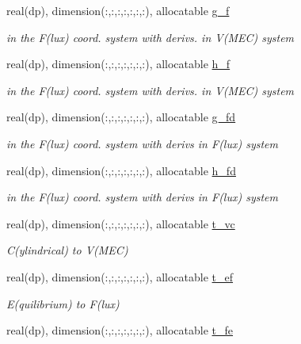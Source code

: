 \begin{DoxyCompactItemize}
real(dp), dimension(\+:,\+:,\+:,\+:,\+:,\+:,\+:), allocatable \hyperlink{structeq__vars_1_1eq__2__type_a86af2ae617633d732fbb3927f10b62d4}{g\+\_\+f}
\begin{DoxyCompactList}\small\item\em in the F(lux) coord. system with derivs. in V(\+M\+E\+C) system \end{DoxyCompactList}\item 
real(dp), dimension(\+:,\+:,\+:,\+:,\+:,\+:,\+:), allocatable \hyperlink{structeq__vars_1_1eq__2__type_a46e78cc3ec0be1ea9db664d9bdf5a214}{h\+\_\+f}
\begin{DoxyCompactList}\small\item\em in the F(lux) coord. system with derivs. in V(\+M\+E\+C) system \end{DoxyCompactList}\item 
real(dp), dimension(\+:,\+:,\+:,\+:,\+:,\+:,\+:), allocatable \hyperlink{structeq__vars_1_1eq__2__type_adaa37b20905a132d62a632ca5a60abf8}{g\+\_\+fd}
\begin{DoxyCompactList}\small\item\em in the F(lux) coord. system with derivs in F(lux) system \end{DoxyCompactList}\item 
real(dp), dimension(\+:,\+:,\+:,\+:,\+:,\+:,\+:), allocatable \hyperlink{structeq__vars_1_1eq__2__type_a88d96d8a7aef70d21b1b7d03ff32486c}{h\+\_\+fd}
\begin{DoxyCompactList}\small\item\em in the F(lux) coord. system with derivs in F(lux) system \end{DoxyCompactList}\item 
real(dp), dimension(\+:,\+:,\+:,\+:,\+:,\+:,\+:), allocatable \hyperlink{structeq__vars_1_1eq__2__type_a66f2d562690cd4176fff5ad75d5feafb}{t\+\_\+vc}
\begin{DoxyCompactList}\small\item\em C(ylindrical) to V(\+M\+E\+C) \end{DoxyCompactList}\item 
real(dp), dimension(\+:,\+:,\+:,\+:,\+:,\+:,\+:), allocatable \hyperlink{structeq__vars_1_1eq__2__type_aa8975d6f7d0a542e46cff08202007bfb}{t\+\_\+ef}
\begin{DoxyCompactList}\small\item\em E(quilibrium) to F(lux) \end{DoxyCompactList}\item 
real(dp), dimension(\+:,\+:,\+:,\+:,\+:,\+:,\+:), allocatable \hyperlink{structeq__vars_1_1eq__2__type_ad2f94e2ccb8336a3fbf825febfb5a1d4}{t\+\_\+fe}

\end{DoxyCompactItemize}
